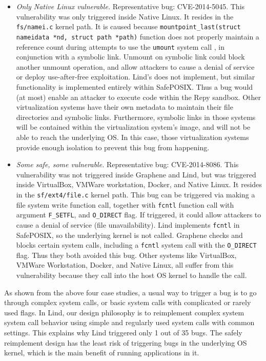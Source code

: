 \begin{itemize}
\item \emph{Only Native Linux vulnerable.}  Representative bug: CVE-2014-5045. 
This vulnerability was only triggered inside Native Linux. It resides in the 
\texttt{fs/namei.c} kernel path. It is caused because 
\texttt{mountpoint\_last(struct nameidata *nd, struct path *path)} function does not properly 
maintain a reference count during attempts to use the \texttt{umount} system call 
, in conjunction with a symbolic link. Unmount on symbolic link could block another unmount operation, 
and allow attackers to cause a denial of service or deploy use-after-free exploitation. 
Lind's does not implement, but similar functionality is implemented entirely 
within SafePOSIX.  Thus a bug would (at most) enable an attacker to execute
code within the Repy sandbox.
Other virtualization systems have their own metadata to maintain their file directories and symbolic links. 
Furthermore, symbolic links in those systems will be contained within the virtualization system's image, 
and will not be able to reach the underlying OS. In this case, those virtualization systems provide enough 
isolation to prevent this bug from happening. 

\item \emph{Some safe, some vulnerable.}  Representative bug: CVE-2014-8086. 
This vulnerability was not triggered inside Graphene and Lind, but was triggered inside 
VirtualBox, VMWare workstation, Docker, and Native Linux. It resides in the \texttt{sf/ext4/file.c} kernel path. 
This bug can be triggered via making a file system write function call, together with \texttt{fcntl} function call 
with argument \texttt{F\_SETFL}, and \texttt{O\_DIRECT} flag. If triggered, it could allow attackers to cause 
a denial of service (file unavailability). Lind implements \texttt{fcntl}
in SafePOSIX, so the underlying kernel is not called.
Graphene checks and blocks certain system calls, including
a \texttt{fcntl} system call with the \texttt{O\_DIRECT} flag. 
Thus they both avoided this bug. Other systems like VirtualBox, VMWare Workstation, Docker, and Native Linux, 
all suffer from this vulnerability because they call into the host OS
kernel to handle the call.

\end{itemize}

As shown from the above four case studies, a usual way to trigger a bug is to go through complex system calls, 
or basic system calls with complicated or rarely used flags. In Lind, our 
design philosophy is to reimplement complex system system call behavior
using simple and regularly used system calls with common settings.
This explains why Lind triggered only
1 out of 35 bugs.  The safely reimplement design
has the least risk of triggering bugs in the underlying OS kernel, 
which is the main benefit of running applications in it.  

